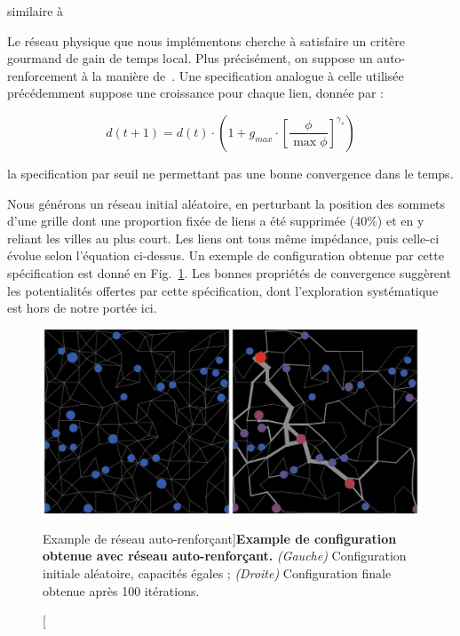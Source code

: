 similaire à \cite{li2014modeling}

Le réseau physique que nous implémentons cherche à satisfaire un critère gourmand de gain de temps local. Plus précisément, on suppose un auto-renforcement à la manière de~\cite{tero2010rules}. Une specification analogue à celle utilisée précédemment suppose une croissance pour chaque lien, donnée par :

\[
d(t+1) = d(t)\cdot \left(1 + g_{max} \cdot \left[\frac{\phi}{\max \phi}\right]^{\gamma_s}\right)
\]


la specification par seuil ne permettant pas une bonne convergence dans le temps.


Nous générons un réseau initial aléatoire, en perturbant la position des sommets d'une grille dont une proportion fixée de liens a été supprimée (40\%) et en y reliant les villes au plus court. Les liens ont tous même impédance, puis celle-ci évolue selon l'équation ci-dessus. Un exemple de configuration obtenue par cette spécification est donné en Fig.~\ref{fig:macrocoevolution:slimemould}. Les bonnes propriétés de convergence suggèrent les potentialités offertes par cette spécification, dont l'exploration systématique est hors de notre portée ici.


\begin{figure}
	\includegraphics[width=\linewidth]{Figures/Final/6-2-3-fig-macrocoevol-slimemould}
	\caption[][Example de réseau auto-renforçant]{}{\textbf{Example de configuration obtenue avec réseau auto-renforçant.} \textit{(Gauche)} Configuration initiale aléatoire, capacités égales ; \textit{(Droite)} Configuration finale obtenue après 100 itérations.\label{fig:macrocoevolution:slimemould}}
\end{figure}



